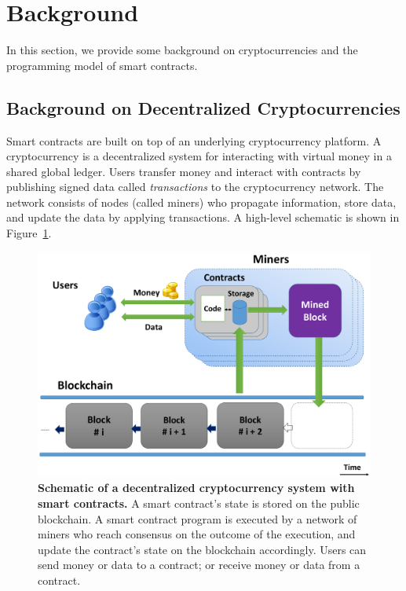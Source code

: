 \documentclass{llncs}
\renewcommand{\paragraph}[1]{\vspace{5pt} \noindent{\bf #1}}
\begin{document}

\section{Background}
\label{sec:Background}
In this section, we provide some background on cryptocurrencies and the programming model of smart contracts.

\subsection{Background on Decentralized Cryptocurrencies}
Smart contracts are built on top of an underlying cryptocurrency platform. A cryptocurrency is a decentralized system for interacting with virtual money in a shared global ledger. Users transfer money and interact with contracts by publishing signed data called \emph{transactions} to the cryptocurrency network. The network consists of nodes (called miners) who propagate information, store data, and update the data by applying transactions. A high-level schematic is shown in Figure~\ref{fig:schematic}.
\begin{figure}[t]
\centering
\includegraphics[width=0.7\columnwidth]{overview_figure}
\caption{{\bf Schematic of a decentralized cryptocurrency system 
with smart contracts.}
A smart contract's state is stored on the public blockchain.
A smart contract program is executed by a 
network of miners who reach consensus on the
outcome of the execution, and update the contract's state 
on the blockchain accordingly.
Users can send money or data to a contract;
or receive money or data from a contract.
}
\label{fig:schematic}
\end{figure}
\end{document}

